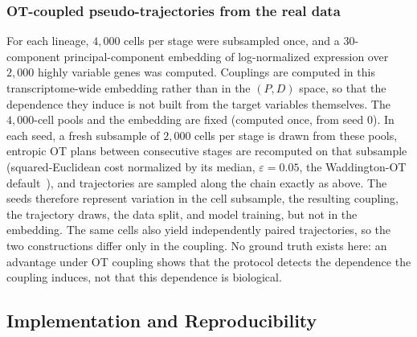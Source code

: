 \documentclass[pdflatex,sn-mathphys-num]{sn-jnl}
\theoremstyle{thmstyleone}%
\theoremstyle{thmstyletwo}%
\theoremstyle{thmstylethree}%
\begin{document}
\subsubsection{OT-coupled pseudo-trajectories from the real data} For each lineage, $4{,}000$ cells per stage were subsampled once, and a $30$-component principal-component embedding of log-normalized expression over $2{,}000$ highly variable genes was computed. Couplings are computed in this transcriptome-wide embedding rather than in the $(P,D)$ space, so that the dependence they induce is not built from the target variables themselves. The $4{,}000$-cell pools and the embedding are fixed (computed once, from seed $0$). In each seed, a fresh subsample of $2{,}000$ cells per stage is drawn from these pools, entropic OT plans between consecutive stages are recomputed on that subsample (squared-Euclidean cost normalized by its median, $\varepsilon=0.05$, the Waddington-OT default~\cite{schiebinger2019optimal}), and trajectories are sampled along the chain exactly as above. The seeds therefore represent variation in the cell subsample, the resulting coupling, the trajectory draws, the data split, and model training, but not in the embedding. The same cells also yield independently paired trajectories, so the two constructions differ only in the coupling. No ground truth exists here: an advantage under OT coupling shows that the protocol detects the dependence the coupling induces, not that this dependence is biological.

\subsection{\textbf{Implementation and Reproducibility}}
\label{subsec:impl_repro}
\end{document}
